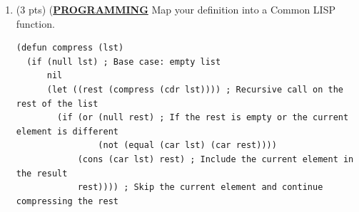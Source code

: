 \documentclass[12pt]{article}
\begin{document}
\begin{spacing}{1.5}
\begin{enumerate}
\begin{enumerate}
		      \end{enumerate}
		      		      
		\item (3 pts) (\uline{\textbf{PROGRAMMING}} Map your definition into a Common LISP function.\\
		      		      
		      \begin{lstlisting}
(defun compress (lst)
  (if (null lst) ; Base case: empty list
      nil
      (let ((rest (compress (cdr lst)))) ; Recursive call on the rest of the list
        (if (or (null rest) ; If the rest is empty or the current element is different
                (not (equal (car lst) (car rest))))
            (cons (car lst) rest) ; Include the current element in the result
            rest)))) ; Skip the current element and continue compressing the rest
		      \end{lstlisting}
		      		              
	\end{enumerate}
\end{spacing}
\end{document}
